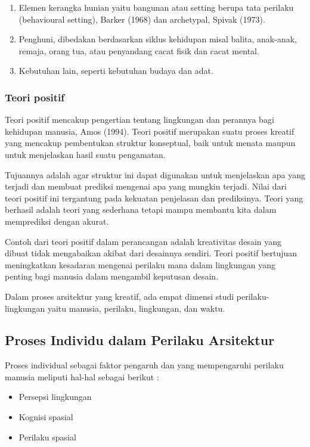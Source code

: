 \documentclass[../manperil.tex]{subfiles}
\begin{document}
\begin{enumerate}
	\item Elemen kerangka hunian yaitu bangunan atau setting berupa tata perilaku (behavioural setting), Barker (1968) dan archetypal, Spivak (1973).
	\item Penghuni, dibedakan berdasarkan siklus kehidupan misal balita, anak-anak, remaja, orang tua, atau penyandang cacat fisik dan cacat mental.
	\item Kebutuhan lain, seperti kebutuhan budaya dan adat.
\end{enumerate}

\subsubsection{Teori positif}%
\label{ssub:teori_positif}

Teori positif mencakup pengertian tentang lingkungan dan perannya bagi kehidupan manusia, Amos (1994). Teori positif merupakan suatu proses kreatif yang mencakup pembentukan struktur konseptual, baik untuk menata maupun untuk menjelaskan hasil suatu pengamatan.

Tujuannya adalah agar struktur ini dapat digunakan untuk menjelaskan apa yang terjadi dan membuat prediksi mengenai apa yang mungkin terjadi. Nilai dari teori positif ini tergantung pada kekuatan penjelasan dan prediksinya. Teori yang berhasil adalah teori yang sederhana tetapi mampu membantu kita dalam memprediksi dengan akurat.

Contoh dari teori positif dalam perancangan adalah kreativitas desain yang dibuat tidak mengabaikan akibat dari desainnya sendiri. Teori positif bertujuan meningkatkan kesadaran mengenai perilaku mana dalam lingkungan yang penting bagi manusia dalam mengambil keputusan desain.

Dalam proses arsitektur yang kreatif, ada empat dimensi studi perilaku-lingkungan yaitu manusia, perilaku, lingkungan, dan waktu.

\subsection{Proses Individu dalam Perilaku Arsitektur}%
\label{sub:Proses Individu dalam Perilaku Arsitektur}

Proses individual sebagai faktor pengaruh dan yang mempengaruhi perilaku manusia meliputi hal-hal sebagai berikut :

\begin{itemize}
	\item Persepsi lingkungan
	\item Kognisi spasial
	\item Perilaku spasial
\end{itemize}
\end{document}
